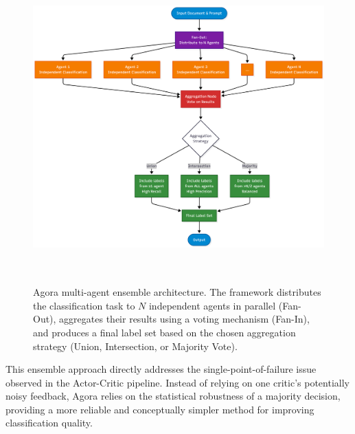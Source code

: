 \begin{figure}[!ht]
\centering
\includegraphics[height=12cm]{assets/diagrams/vote-based.png}
\caption{Agora multi-agent ensemble architecture. The framework distributes the classification task to $N$ independent agents in parallel (Fan-Out), aggregates their results using a voting mechanism (Fan-In), and produces a final label set based on the chosen aggregation strategy (Union, Intersection, or Majority Vote).}
\label{fig:vote_based_ensemble}
\end{figure}

This ensemble approach directly addresses the single-point-of-failure issue observed in the Actor-Critic pipeline. Instead of relying on one critic's potentially noisy feedback, Agora relies on the statistical robustness of a majority decision, providing a more reliable and conceptually simpler method for improving classification quality.
